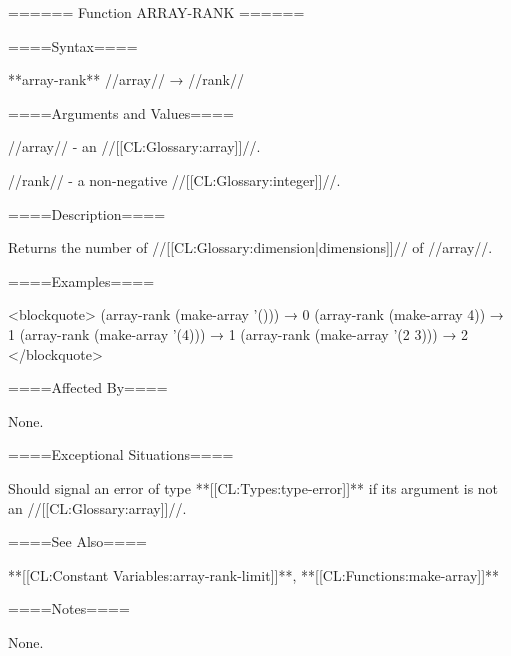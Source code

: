 ====== Function ARRAY-RANK ======

====Syntax====

**array-rank** //array// → //rank//

====Arguments and Values====

//array// - an //[[CL:Glossary:array]]//.

//rank// - a non-negative //[[CL:Glossary:integer]]//.

====Description====

Returns the number of //[[CL:Glossary:dimension|dimensions]]// of //array//.

====Examples====

<blockquote> (array-rank (make-array '())) → 0 (array-rank (make-array 4)) → 1 (array-rank (make-array '(4))) → 1 (array-rank (make-array '(2 3))) → 2 </blockquote>

====Affected By====

None.

====Exceptional Situations====

Should signal an error of type **[[CL:Types:type-error]]** if its argument is not an //[[CL:Glossary:array]]//.

====See Also====

**[[CL:Constant Variables:array-rank-limit]]**, **[[CL:Functions:make-array]]**

====Notes====

None.

